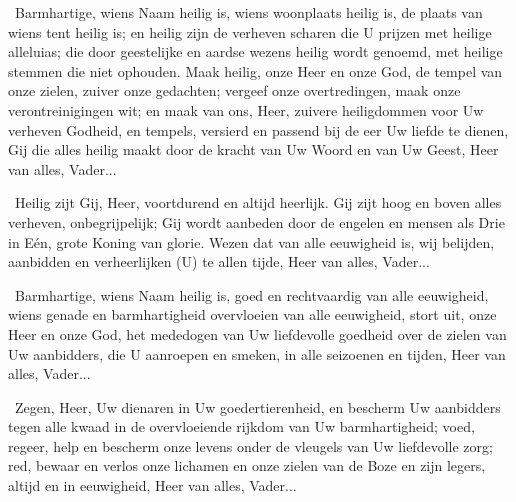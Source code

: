 \documentclass[12pt,twoside,a5paper]{article}
\begin{document}
\begin{halfparskip}
   \cc~Barmhartige, wiens Naam heilig is, wiens woonplaats heilig is, de plaats van wiens tent heilig is; en heilig zijn de verheven scharen die U prijzen met heilige alleluias; die door geestelijke en aardse wezens heilig wordt genoemd, met heilige stemmen die niet ophouden. Maak heilig, onze Heer en onze God, de tempel van onze zielen, zuiver onze gedachten; vergeef onze overtredingen, maak onze verontreinigingen wit; en maak van ons, Heer, zuivere heiligdommen voor Uw verheven Godheid, en tempels, versierd en passend bij de eer Uw liefde te dienen, Gij die alles heilig maakt door de kracht van Uw Woord en van Uw Geest, Heer van alles, Vader...

  \cc~Heilig zijt Gij, Heer, voortdurend en altijd heerlijk. Gij zijt hoog en boven alles verheven, onbegrijpelijk; Gij wordt aanbeden door de engelen en mensen als Drie in Eén, grote Koning van glorie. Wezen dat van alle eeuwigheid is, wij belijden, aanbidden en verheerlijken (U) te allen tijde, Heer van alles, Vader...
\end{halfparskip}

\begin{halfparskip}
   \cc~Barmhartige, wiens Naam heilig is, goed en rechtvaardig van alle eeuwigheid, wiens genade en barmhartigheid overvloeien van alle eeuwigheid, stort uit, onze Heer en onze God, het mededogen van Uw liefdevolle goedheid over de zielen van Uw aanbidders, die U aanroepen en smeken, in alle seizoenen en tijden, Heer van alles, Vader...

  \cc~Zegen, Heer, Uw dienaren in Uw goedertierenheid, en bescherm Uw aanbidders tegen alle kwaad in de overvloeiende rijkdom van Uw barmhartigheid; voed, regeer, help en bescherm onze levens onder de vleugels van Uw liefdevolle zorg; red, bewaar en verlos onze lichamen en onze zielen van de Boze en zijn legers, altijd en in eeuwigheid, Heer van alles, Vader...
\end{halfparskip}


\CLEARPAGEAV


\end{document}
